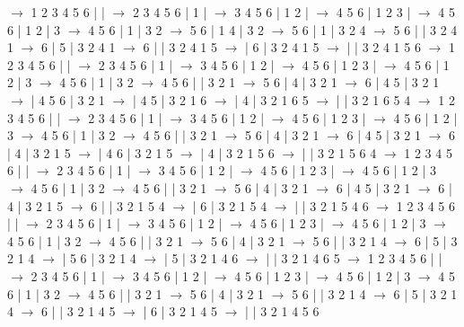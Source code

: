 \documentclass{article}
\begin{document}
\newline
 $\rightarrow$ 1 2 3 4 5 6 |  |  $\rightarrow$ 2 3 4 5 6 | 1 |  $\rightarrow$ 3 4 5 6 | 1 2 |  $\rightarrow$ 4 5 6 | 1 2 3 |  $\rightarrow$ 4 5 6 | 1 2 | 3 $\rightarrow$ 4 5 6 | 1 | 3 2 $\rightarrow$ 5 6 | 1 4 | 3 2 $\rightarrow$ 5 6 | 1 | 3 2 4 $\rightarrow$ 5 6 |  | 3 2 4 1 $\rightarrow$ 6 | 5 | 3 2 4 1 $\rightarrow$ 6 |  | 3 2 4 1 5 $\rightarrow$  | 6 | 3 2 4 1 5 $\rightarrow$  |  | 3 2 4 1 5 6
\newline
 $\rightarrow$ 1 2 3 4 5 6 |  |  $\rightarrow$ 2 3 4 5 6 | 1 |  $\rightarrow$ 3 4 5 6 | 1 2 |  $\rightarrow$ 4 5 6 | 1 2 3 |  $\rightarrow$ 4 5 6 | 1 2 | 3 $\rightarrow$ 4 5 6 | 1 | 3 2 $\rightarrow$ 4 5 6 |  | 3 2 1 $\rightarrow$ 5 6 | 4 | 3 2 1 $\rightarrow$ 6 | 4 5 | 3 2 1 $\rightarrow$  | 4 5 6 | 3 2 1 $\rightarrow$  | 4 5 | 3 2 1 6 $\rightarrow$  | 4 | 3 2 1 6 5 $\rightarrow$  |  | 3 2 1 6 5 4
\newline
 $\rightarrow$ 1 2 3 4 5 6 |  |  $\rightarrow$ 2 3 4 5 6 | 1 |  $\rightarrow$ 3 4 5 6 | 1 2 |  $\rightarrow$ 4 5 6 | 1 2 3 |  $\rightarrow$ 4 5 6 | 1 2 | 3 $\rightarrow$ 4 5 6 | 1 | 3 2 $\rightarrow$ 4 5 6 |  | 3 2 1 $\rightarrow$ 5 6 | 4 | 3 2 1 $\rightarrow$ 6 | 4 5 | 3 2 1 $\rightarrow$ 6 | 4 | 3 2 1 5 $\rightarrow$  | 4 6 | 3 2 1 5 $\rightarrow$  | 4 | 3 2 1 5 6 $\rightarrow$  |  | 3 2 1 5 6 4
\newline
 $\rightarrow$ 1 2 3 4 5 6 |  |  $\rightarrow$ 2 3 4 5 6 | 1 |  $\rightarrow$ 3 4 5 6 | 1 2 |  $\rightarrow$ 4 5 6 | 1 2 3 |  $\rightarrow$ 4 5 6 | 1 2 | 3 $\rightarrow$ 4 5 6 | 1 | 3 2 $\rightarrow$ 4 5 6 |  | 3 2 1 $\rightarrow$ 5 6 | 4 | 3 2 1 $\rightarrow$ 6 | 4 5 | 3 2 1 $\rightarrow$ 6 | 4 | 3 2 1 5 $\rightarrow$ 6 |  | 3 2 1 5 4 $\rightarrow$  | 6 | 3 2 1 5 4 $\rightarrow$  |  | 3 2 1 5 4 6
\newline
 $\rightarrow$ 1 2 3 4 5 6 |  |  $\rightarrow$ 2 3 4 5 6 | 1 |  $\rightarrow$ 3 4 5 6 | 1 2 |  $\rightarrow$ 4 5 6 | 1 2 3 |  $\rightarrow$ 4 5 6 | 1 2 | 3 $\rightarrow$ 4 5 6 | 1 | 3 2 $\rightarrow$ 4 5 6 |  | 3 2 1 $\rightarrow$ 5 6 | 4 | 3 2 1 $\rightarrow$ 5 6 |  | 3 2 1 4 $\rightarrow$ 6 | 5 | 3 2 1 4 $\rightarrow$  | 5 6 | 3 2 1 4 $\rightarrow$  | 5 | 3 2 1 4 6 $\rightarrow$  |  | 3 2 1 4 6 5
\newline
 $\rightarrow$ 1 2 3 4 5 6 |  |  $\rightarrow$ 2 3 4 5 6 | 1 |  $\rightarrow$ 3 4 5 6 | 1 2 |  $\rightarrow$ 4 5 6 | 1 2 3 |  $\rightarrow$ 4 5 6 | 1 2 | 3 $\rightarrow$ 4 5 6 | 1 | 3 2 $\rightarrow$ 4 5 6 |  | 3 2 1 $\rightarrow$ 5 6 | 4 | 3 2 1 $\rightarrow$ 5 6 |  | 3 2 1 4 $\rightarrow$ 6 | 5 | 3 2 1 4 $\rightarrow$ 6 |  | 3 2 1 4 5 $\rightarrow$  | 6 | 3 2 1 4 5 $\rightarrow$  |  | 3 2 1 4 5 6
\end{document}

